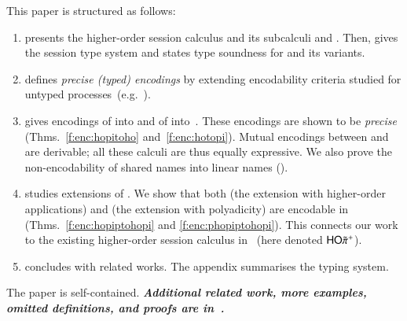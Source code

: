  This paper 
is structured as follows:
\begin{enumerate}[$\bullet$]
\item {} presents the higher-order session calculus \HOp and its 
subcalculi \HO and \sessp.  Then,  gives the session type system
and states type soundness for \HOp and its variants.
\item {} defines \emph{precise (typed) encodings} by extending encodability criteria 
studied for
untyped processes~(e.g.~\cite{DBLP:journals/iandc/Gorla10,DBLP:conf/icalp/LanesePSS10}).
\item {} %
gives encodings of \HOp into \HO and of \HOp into~\sessp.
These encodings 
are shown to be \emph{precise} (Thms.~\ref{f:enc:hopitoho} and~\ref{f:enc:hotopi}).
Mutual encodings between \sessp and \HO are derivable; 
all these calculi are thus equally expressive.
We also prove the non-encodability of shared names
into linear names ().

\item {} studies extensions of \HOp. We show that 
both \HOpp (the extension with higher-order applications) 
and \pHOp (the extension with polyadicity) are encodable in \HOp
(Thms.~\ref{f:enc:hopiptohopi} and \ref{f:enc:phopiptohopi}).
This connects our work 
to the existing
higher-order session calculus in~\cite{tlca07} (here denoted  $\mathsf{HO}{\tilde{\pi}}^{+}$).

\item {} concludes with related works. The appendix summarises the typing system. 
\end{enumerate}
\noi
The paper is self-contained. 
{\bf\em Additional related work, more examples, omitted definitions, and  proofs 
are 
in~\cite{KouzapasPY15}.} 

